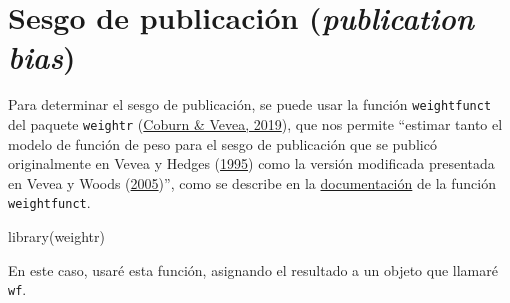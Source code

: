 \documentclass[
  bookmarksnumbered]{article}
\newenvironment{Shaded}{\begin{snugshade}}{\end{snugshade}}
\newcommand{\AttributeTok}[1]{\textcolor[rgb]{0.00,0.34,0.68}{#1}}
\newcommand{\ConstantTok}[1]{\textcolor[rgb]{0.67,0.33,0.00}{#1}}
\newcommand{\FunctionTok}[1]{\textcolor[rgb]{0.39,0.29,0.61}{#1}}
\newcommand{\NormalTok}[1]{\textcolor[rgb]{0.12,0.11,0.11}{#1}}
\newcommand{\OtherTok}[1]{\textcolor[rgb]{0.00,0.43,0.16}{#1}}
\newcommand{\SpecialCharTok}[1]{\textcolor[rgb]{0.24,0.68,0.91}{#1}}
\begin{document}
\hypertarget{sesgo-pub}{%
\section{\texorpdfstring{Sesgo de publicación (\emph{publication bias})}{Sesgo de publicación (publication bias)}}\label{sesgo-pub}}

Para determinar el sesgo de publicación, se puede usar la función \texttt{weightfunct} del paquete \texttt{weightr} (\protect\hyperlink{ref-coburnWeightr2019}{Coburn \& Vevea, 2019}), que nos permite ``estimar tanto el modelo de función de peso para el sesgo de publicación que se publicó originalmente en Vevea y Hedges (\protect\hyperlink{ref-veveaGeneralLinearModel1995}{1995}) como la versión modificada presentada en Vevea y Woods (\protect\hyperlink{ref-veveaPublicationBiasResearch2005}{2005})'', como se describe en la \href{https://www.rdocumentation.org/packages/weightr/versions/2.0.2/topics/weightfunct}{documentación} de la función \texttt{weightfunct}.

\begin{Shaded}
\begin{Highlighting}[]
\FunctionTok{library}\NormalTok{(weightr)}
\end{Highlighting}
\end{Shaded}

En este caso, usaré esta función, asignando el resultado a un objeto que llamaré \texttt{wf}.

\begin{Shaded}
\end{Shaded}
\end{document}
